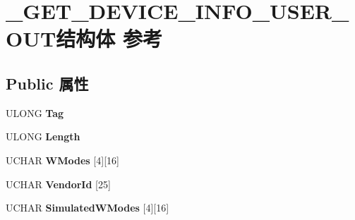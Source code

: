 \hypertarget{struct___g_e_t___d_e_v_i_c_e___i_n_f_o___u_s_e_r___o_u_t}{}\section{\+\_\+\+G\+E\+T\+\_\+\+D\+E\+V\+I\+C\+E\+\_\+\+I\+N\+F\+O\+\_\+\+U\+S\+E\+R\+\_\+\+O\+U\+T结构体 参考}
\label{struct___g_e_t___d_e_v_i_c_e___i_n_f_o___u_s_e_r___o_u_t}
\subsection*{Public 属性}
\begin{DoxyCompactItemize}
\item 
\mbox{\label{struct___g_e_t___d_e_v_i_c_e___i_n_f_o___u_s_e_r___o_u_t_a8241aaf7812ebe28c606f9269b13febc}} 
U\+L\+O\+NG {\bfseries Tag}
\item 
\mbox{\label{struct___g_e_t___d_e_v_i_c_e___i_n_f_o___u_s_e_r___o_u_t_a3ef64dfb010b53b9cc67f64c8f25e552}} 
U\+L\+O\+NG {\bfseries Length}
\item 
\mbox{\label{struct___g_e_t___d_e_v_i_c_e___i_n_f_o___u_s_e_r___o_u_t_ad2d21bd0912ca8aa9487462a22093460}} 
U\+C\+H\+AR {\bfseries W\+Modes} \mbox{[}4\mbox{]}\mbox{[}16\mbox{]}
\item 
\mbox{\label{struct___g_e_t___d_e_v_i_c_e___i_n_f_o___u_s_e_r___o_u_t_ad5af7e09c0fbb00de6fe20f67c49c502}} 
U\+C\+H\+AR {\bfseries Vendor\+Id} \mbox{[}25\mbox{]}
\item 
\mbox{\label{struct___g_e_t___d_e_v_i_c_e___i_n_f_o___u_s_e_r___o_u_t_a18e765228946cdc438dbc876415d5ba7}} 
U\+C\+H\+AR {\bfseries Simulated\+W\+Modes} \mbox{[}4\mbox{]}\mbox{[}16\mbox{]}
\item 
\mbox{\label{struct___g_e_t___d_e_v_i_c_e___i_n_f_o___u_s_e_r___o_u_t_a8af51dea8f71c3f3485843b91043bd76}} 

\end{DoxyCompactItemize}

